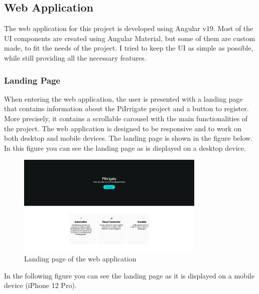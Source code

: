 \subsection {Web Application}
The web application for this project is developed using Angular v19. Most of the UI components are 
created using Angular Material, but some of them are custom made, to fit the needs of the project.
I tried to keep the UI as simple as possible, while still providing all the necessary features.

\subsubsection{Landing Page}
When entering the web application, the user is presented with a landing page that contains information about
the PiIrrigate project and a button to register. More precisely, it contains a scrollable carousel with the 
main functionalities of the project.
The web application is designed to be responsive and
to work on both desktop and mobile devices. The landing page is shown in the figure below. In this 
figure you can see the landing page as is displayed on a desktop device.

\begin{figure}[H]
    \centering
    \includegraphics[width=0.8\textwidth]{images/landing_page.png}
    \caption{Landing page of the web application}
    \label{fig:landing-page}
\end{figure}

In the following figure you can see the landing page as it is displayed on a mobile device (iPhone 12 Pro).

